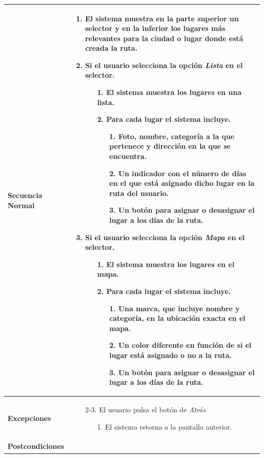 \begin{longtable}{| p{4cm} | p{10cm} |}
\hline
\textbf{Secuencia Normal} &\mbox{}\par\vspace{-\baselineskip}
\begin{enumerate}[leftmargin=0.7cm, topsep=0.1cm]
\item El sistema muestra en la parte superior un selector y en la inferior los lugares más relevantes para la ciudad o lugar donde está creada la ruta.
\item Si el usuario selecciona la opción \textit{Lista} en el selector.
	\begin{itemize}
	\item[1.] El sistema muestra los lugares en una lista.
	\item[2.] Para cada lugar el sistema incluye.
		\begin{itemize}
		\item[1.] Foto, nombre, categoría a la que pertenece y dirección en la que se encuentra.
		\item[2.] Un indicador con el número de días en el que está asignado dicho lugar en la ruta del usuario.
		\item[3.] Un botón para asignar o desasignar el lugar a los días de la ruta.
		\end{itemize}
	\end{itemize}
\item Si el usuario selecciona la opción \textit{Mapa} en el selector.
	\begin{itemize}
	\item[1.] El sistema muestra los lugares en el mapa.
	\item[2.] Para cada lugar el sistema incluye.
		\begin{itemize}
		\item[1.] Una marca, que incluye nombre y categoría, en la ubicación exacta en el mapa.
		\item[2.] Un color diferente en función de si el lugar está asignado o no a la ruta.
		\item[3.] Un botón para asignar o desasignar el lugar a los días de la ruta.
		\end{itemize}
	\end{itemize}
\end{enumerate}


\\
\hline
\textbf{Excepciones} &\mbox{}\par\vspace{-\baselineskip}
\begin{enumerate}[leftmargin=0.9cm, topsep=0.1cm]
\item[2-3.] El usuario pulsa el botón de \textit{Atrás}.
	\begin{itemize}
	\item[1.] El sistema retorna a la pantalla anterior.
	\end{itemize}
\end{enumerate}
\\

\hline
\textbf{Postcondiciones} & \\
\hline
\end{longtable}


